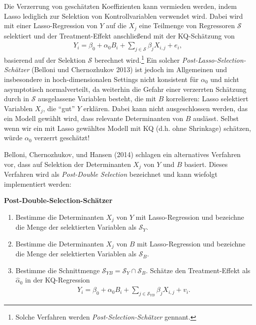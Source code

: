 \documentclass[
  a4paper,
  DIV=11,
  oneside]{scrreprt}
\begin{document}
Die Verzerrung von geschätzten Koeffizienten kann vermieden werden,
indem Lasso lediglich zur Selektion von Kontrollvariablen verwendet
wird. Dabei wird mit einer Lasso-Regression von \(Y\) auf die \(X_j\)
eine Teilmenge von Regressoren \(\mathcal{S}\) selektiert und der
Treatment-Effekt anschließend mit der KQ-Schätzung von \begin{align}
  Y_i = \beta_0 + \alpha_0 B_i + \sum_{j\in\mathcal{S}} \beta_{j} X_{i,j} + e_i,
\end{align} basierend auf der Selektion \(\mathcal{S}\) berechnet
wird.\footnote{Solche Verfahren werden \emph{Post-Selection-Schätzer}
  gennant.} Ein solcher \emph{Post-Lasso-Selection-Schätzer} (Belloni
und Chernozhukov 2013) ist jedoch im Allgemeinen und insbesondere in
hoch-dimensionalen Settings nicht konsistent für \(\alpha_0\) und nicht
asymptotisch normalverteilt, da weiterhin die Gefahr einer verzerrten
Schätzung durch in \(\mathcal{S}\) ausgelassene Variablen besteht, die
mit \(B\) korrelieren: Lasso selektiert Variablen \(X_j\), die ``gut''
\(Y\) erklären. Dabei kann nicht ausgeschlossen werden, das ein Modell
gewählt wird, dass relevante Determinanten von \(B\) auslässt. Selbst
wenn wir ein mit Lasso gewähltes Modell mit KQ (d.h. ohne Shrinkage)
schätzen, würde \(\alpha_0\) verzerrt geschätzt!

Belloni, Chernozhukov, und Hansen (2014) schlagen ein alternatives
Verfahren vor, dass auf Selektion der Determinanten \(X_j\) von \(Y\)
und \(B\) basiert. Dieses Verfahren wird als \emph{Post-Double
Selection} bezeichnet und kann wiefolgt implementiert werden:

\textbf{Post-Double-Selection-Schätzer}

\begin{enumerate}
\def\labelenumi{\arabic{enumi}.}
\item
  Bestimme die Determinanten \(X_j\) von \(Y\) mit Lasso-Regression und
  bezeichne die Menge der selektierten Variablen als \(\mathcal{S}_Y\).
\item
  Bestimme die Determinanten \(X_j\) von \(B\) mit Lasso-Regression und
  bezeichne die Menge der selektierten Variablen als \(\mathcal{S}_B\).
\item
  Bestimme die Schnittmenge
  \(\mathcal{S}_{YB} = \mathcal{S}_Y \cap \mathcal{S}_B\). Schätze den
  Treatment-Effekt als \(\widehat{\alpha}_0\) in der KQ-Regression
  \begin{align}
    Y_i = \beta_0 + \alpha_0 B_i + \sum_{j\in\mathcal{S}_{YB}} \beta_{j} X_{i,j} + v_i.
  \end{align}
\end{enumerate}
\end{document}
